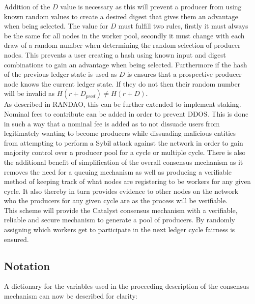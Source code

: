 \documentclass{article}
\begin{document}
Addition of the $D$ value is necessary as this will prevent a producer from using known random values to create a desired digest that gives them an advantage when being selected. The value for $D$ must fulfill two rules, firstly it must always be the same for all nodes in the worker pool, secondly it must change with each draw of a random number when determining the random selection of producer nodes. This prevents a user creating a hash using known input and digest combinations to gain an advantage when being selected. Furthermore if the hash of the previous ledger state is used as $D$ is ensures that a prospective producer node knows the current ledger state. If they do not then their random number will be invalid as $H(r + D_{prod}) \neq H(r + D)$. \\

As described in RANDAO, this can be further extended to implement staking. Nominal fees to contribute can be added in order to prevent DDOS. This is done in such a way that a nominal fee is added as to not dissuade users from legitimately wanting to become producers while dissuading malicious entities from attempting to perform a Sybil attack against the network in order to gain majority control over a producer pool for a cycle or multiple cycle. There is also the additional benefit of simplification of the overall consensus mechanism as it removes the need for a queuing mechanism as well as producing a verifiable method of keeping track of what nodes are registering to be workers for any given cycle. It also thereby in turn provides evidence to other nodes on the network who the producers for any given cycle are as the process will be verifiable. \\

This scheme will provide the Catalyst consensus mechanism with a verifiable, reliable and secure mechanism to generate a pool of producers. By randomly assigning which workers get to participate in the next ledger cycle fairness is ensured. \\




\subsection{Notation} 

A dictionary for the variables used in the proceeding description of the consensus mechanism can now be described for clarity:
\end{document}
